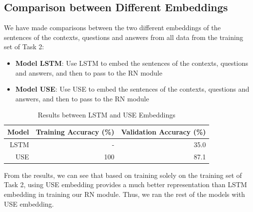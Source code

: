 \documentclass{article}
\begin{document}
\subsection{Comparison between Different Embeddings}

 

 

We have made comparisons between the two different embeddings of the sentences of the contexts, questions and answers from all data from the training set of Task 2:

 

\begin{itemize}

\item \textbf{Model LSTM}: Use LSTM to embed the sentences of the contexts, questions and answers, and then to pass to the RN module

\item \textbf{Model USE}: Use USE to embed the sentences of the contexts, questions and answers, and then to pass to the RN module

\end{itemize}

 
\begin{table}[H]


\begin{center}

\begin{tabular}{|r|r|r|}

 

\hline

\textbf{Model}&\textbf{Training Accuracy (\%)}&\textbf{Validation Accuracy (\%)}\\

\hline

LSTM & - & 35.0\\

\hline

USE & 100 & 87.1\\

\hline

 
\end{tabular}


\label{tab:diffembed}


\end{center}
\caption{Results between LSTM and USE Embeddings}
\end{table} 

From the results, we can see that based on training solely on the training set of Task 2, using USE embedding provides a much better representation than LSTM embedding in training our RN module. Thus, we ran the rest of the models with USE embedding.
\end{document}
